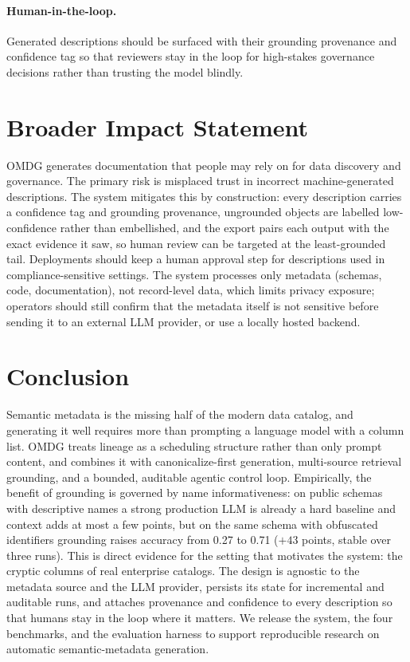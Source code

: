 \paragraph{Human-in-the-loop.} Generated descriptions should be surfaced with their
grounding provenance and confidence tag so that reviewers stay in the loop for high-stakes
governance decisions rather than trusting the model blindly.

\section*{Broader Impact Statement}
OMDG generates documentation that people may rely on for data discovery and governance. The
primary risk is misplaced trust in incorrect machine-generated descriptions. The system
mitigates this by construction: every description carries a confidence tag and grounding
provenance, ungrounded objects are labelled low-confidence rather than embellished, and the
export pairs each output with the exact evidence it saw, so human review can be targeted at
the least-grounded tail. Deployments should keep a human approval step for descriptions
used in compliance-sensitive settings. The system processes only metadata (schemas, code,
documentation), not record-level data, which limits privacy exposure; operators should
still confirm that the metadata itself is not sensitive before sending it to an external
LLM provider, or use a locally hosted backend.

\section{Conclusion}
Semantic metadata is the missing half of the modern data catalog, and generating it well
requires more than prompting a language model with a column list. OMDG treats lineage as a
scheduling structure rather than only prompt content, and combines it with
canonicalize-first generation, multi-source retrieval grounding, and a bounded, auditable
agentic control loop. Empirically, the benefit of grounding is governed by name
informativeness: on public schemas with descriptive names a strong production LLM is
already a hard baseline and context adds at most a few points, but on the same schema with
obfuscated identifiers grounding raises accuracy from 0.27 to 0.71 ($+43$ points, stable
over three runs). This is direct evidence for the setting that motivates the system: the
cryptic columns of real enterprise catalogs. The design is agnostic to the metadata source
and the LLM provider, persists its state for incremental and auditable runs, and attaches
provenance and confidence to every description so that humans stay in the loop where it
matters. We release the system, the four benchmarks, and the evaluation harness to support
reproducible research on automatic semantic-metadata generation.

